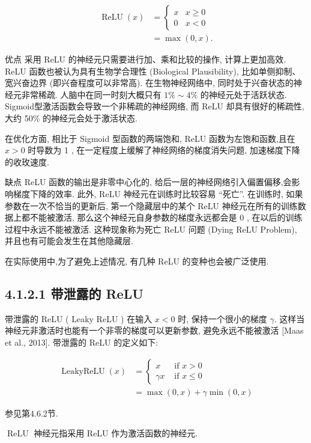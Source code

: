\documentclass[10pt]{article}
\begin{document}
\begin{align*}
\operatorname{ReLU}(x) & = \begin{cases}x & x \geq 0 \\
0 & x<0\end{cases}  \tag{4.16}\\
& =\max (0, x) . \tag{4.17}
\end{align*}


优点 采用 ReLU 的神经元只需要进行加、乘和比较的操作, 计算上更加高效. ReLU 函数也被认为具有生物学合理性 (Biological Plausibility), 比如单侧抑制、宽兴奋边界 (即兴奋程度可以非常高). 在生物神经网络中, 同时处于兴奋状态的神经元非常稀疏. 人脑中在同一时刻大概只有 $1 \% \sim 4 \%$ 的神经元处于活跃状态. Sigmoid型激活函数会导致一个非稀疏的神经网络, 而 ReLU 却具有很好的稀疏性,大约 50\% 的神经元会处于激活状态.

在优化方面, 相比于 Sigmoid 型函数的两端饱和, ReLU 函数为左饱和函数,且在 $x>0$ 时导数为 1 , 在一定程度上缓解了神经网络的梯度消失问题, 加速梯度下降的收玫速度.

缺点 ReLU 函数的输出是非零中心化的, 给后一层的神经网络引入偏置偏移,会影响梯度下降的效率. 此外, ReLU 神经元在训练时比较容易 “死亡”. 在训练时, 如果参数在一次不恰当的更新后, 第一个隐藏层中的某个 ReLU 神经元在所有的训练数据上都不能被激活, 那么这个神经元自身参数的梯度永远都会是 0 , 在以后的训练过程中永远不能被激活. 这种现象称为死亡 ReLU 问题 (Dying ReLU Problem), 并且也有可能会发生在其他隐藏层.

在实际使用中,为了避免上述情况, 有几种 ReLU 的变种也会被广泛使用.

\subsection*{4.1.2.1 带泄露的 ReLU}
带泄露的 ReLU ( Leaky ReLU ) 在输入 $x<0$ 时, 保持一个很小的梯度 $\gamma$. 这样当神经元非激活时也能有一个非零的梯度可以更新参数, 避免永远不能被激活 [Maas et al., 2013]. 带泄露的 ReLU 的定义如下:


\begin{align*}
\operatorname{LeakyReLU}(x) & = \begin{cases}x & \text { if } x>0 \\
\gamma x & \text { if } x \leq 0\end{cases}  \tag{4.18}\\
& =\max (0, x)+\gamma \min (0, x) \tag{4.19}
\end{align*}


参见第4.6.2节.

$\operatorname{ReLU}$ 神经元指采用 ReLU 作为激活函数的神经元.
\end{document}
